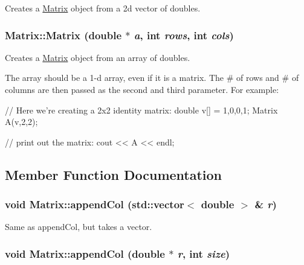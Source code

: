 Creates a \hyperlink{class_matrix}{Matrix} object from a 2d vector of doubles. 

\hypertarget{class_matrix_a3179cefb929e09cbdc95d143e1d9e3d2}{
\subsubsection[{Matrix}]{\setlength{\rightskip}{0pt plus 5cm}Matrix::Matrix (double $\ast$ {\em a}, \/  int {\em rows}, \/  int {\em cols})}}
\label{class_matrix_a3179cefb929e09cbdc95d143e1d9e3d2}


Creates a \hyperlink{class_matrix}{Matrix} object from an array of doubles. 

The array should be a 1-\/d array, even if it is a matrix. The \# of rows and \# of columns are then passed as the second and third parameter. For example:


\begin{DoxyCode}
            // Here we're creating a 2x2 identity matrix:
            double v[] = {1,0,0,1};
            Matrix A(v,2,2);
            
            // print out the matrix:
            cout << A << endl;
\end{DoxyCode}
 

\subsection{Member Function Documentation}
\hypertarget{class_matrix_a726f7ae83284c090af821752628974af}{
\subsubsection[{appendCol}]{\setlength{\rightskip}{0pt plus 5cm}void Matrix::appendCol (std::vector$<$ double $>$ \& {\em r})}}
\label{class_matrix_a726f7ae83284c090af821752628974af}


Same as appendCol, but takes a vector. 

\hypertarget{class_matrix_aae8efe9de26740e3c953e43de55963b2}{
\subsubsection[{appendCol}]{\setlength{\rightskip}{0pt plus 5cm}void Matrix::appendCol (double $\ast$ {\em r}, \/  int {\em size})}}
\label{class_matrix_aae8efe9de26740e3c953e43de55963b2}



